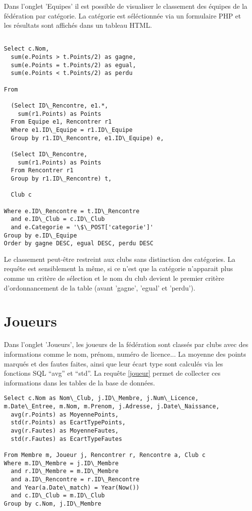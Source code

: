 \documentclass[a4paper»,8pt,french,fleqn]{report}
\begin{document}
Dans l'onglet 'Equipes' il est possible de visualiser le classement des équipes de la fédération par catégorie. La catégorie est séléctionnée via un formulaire PHP et les résultats sont affichés dans un tableau HTML.

\begin{lstlisting}

Select c.Nom,
  sum(e.Points > t.Points/2) as gagne,
  sum(e.Points = t.Points/2) as egual,
  sum(e.Points < t.Points/2) as perdu
  
From
  
  (Select ID\_Rencontre, e1.*,
    sum(r1.Points) as Points
  From Equipe e1, Rencontrer r1
  Where e1.ID\_Equipe = r1.ID\_Equipe
  Group by r1.ID\_Rencontre, e1.ID\_Equipe) e,

  (Select ID\_Rencontre,
    sum(r1.Points) as Points
  From Rencontrer r1
  Group by r1.ID\_Rencontre) t,
  
  Club c

Where e.ID\_Rencontre = t.ID\_Rencontre
  and e.ID\_Club = c.ID\_Club
  and e.Categorie = '\$\_POST['categorie']'
Group by e.ID\_Equipe
Order by gagne DESC, egual DESC, perdu DESC

\end{lstlisting}

Le classement peut-être restreint aux clubs sans distinction des catégories. La requête est sensiblement la même, si ce n'est que la catégorie n'apparait plus comme un critère de sélection et le nom du club devient le premier critère d'ordonnancement de la table (avant 'gagne', 'egual' et 'perdu'). 


\section{Joueurs}
Dans l'onglet 'Joueurs', les joueurs de la fédération sont classés par clubs avec des informations comme le nom, prénom, numéro de licence... La moyenne des points marqués et des fautes faites, ainsi que leur écart type sont calculés via les fonctions SQL ``avg'' et ``std''. La requête \ref{joueur} permet de collecter ces informations dans les tables de la base de données.

\begin{lstlisting}
Select c.Nom as Nom\_Club, j.ID\_Membre, j.Num\_Licence, m.Date\_Entree, m.Nom, m.Prenom, j.Adresse, j.Date\_Naissance,
  avg(r.Points) as MoyennePoints,
  std(r.Points) as EcartTypePoints,
  avg(r.Fautes) as MoyenneFautes,
  std(r.Fautes) as EcartTypeFautes

From Membre m, Joueur j, Rencontrer r, Rencontre a, Club c
Where m.ID\_Membre = j.ID\_Membre
  and r.ID\_Membre = m.ID\_Membre
  and a.ID\_Rencontre = r.ID\_Rencontre
  and Year(a.Date\_match) = Year(Now())
  and c.ID\_Club = m.ID\_Club
Group by c.Nom, j.ID\_Membre
\end{lstlisting}
\end{document}
